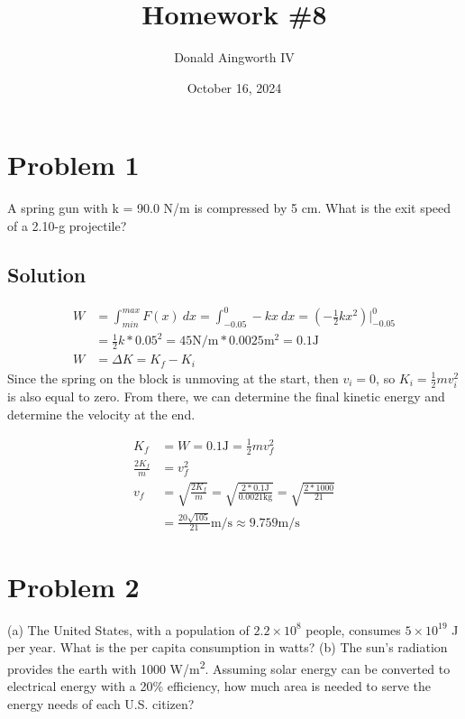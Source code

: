 \documentclass[12pt]{article}
\title{Homework \#8}
\author{Donald Aingworth IV}
\date{October 16, 2024}
\begin{document}


\section*{Problem 1}
A spring gun with k = 90.0 N/m is compressed by 5 cm. What is the exit speed of a 2.10-g projectile?

\subsection*{Solution}

\begin{align*}
    W   &= \int_{min}^{max} F(x)\ dx = \int_{-0.05}^{0} -kx\ dx = \left(-\frac{1}{2}kx^2\right)\vert_{-0.05}^{0} \\
        &= \frac{1}{2}k*0.05^2 = 45\unit{\newton/\meter} * 0.0025\unit{\meter^2} = 0.1 \unit{\joule}\\
    W   &=  \Delta K = K_f - K_i
\end{align*}
Since the spring on the block is unmoving at the start, then $v_i = 0$, so $K_i = \frac{1}{2}mv_i^2$ is also equal to zero. From there, we can determine the final kinetic energy and determine the velocity at the end.

\begin{align*}
    K_f &= W = 0.1\unit{\joule} = \frac{1}{2}mv_f^2\\
    \frac{2K_f}{m} &= v_f^2\\
    v_f &= \sqrt{\frac{2K_f}{m}} 
        = \sqrt{\frac{2*0.1\unit{\joule}}{0.0021\unit{\kilo\gram}}}
        = \sqrt{\frac{2*1000}{21}}\\
        &= \boxed{\frac{20\sqrt{105}}{21} \unit{\meter/\second} \approx 9.759 \unit{\meter/\second}}
\end{align*}

\pagebreak
\section*{Problem 2}
(a) The United States, with a population of $2.2 \times 10^8$ people, consumes $5 \times 10^{19}$ J per year. What is the per capita consumption in watts? (b) The sun's radiation provides the earth with 1000 \unit{\watt/\meter^2}. Assuming solar energy can be converted to electrical energy with a 20\% efficiency, how much area is needed to serve the energy needs of each U.S. citizen?
\end{document}

